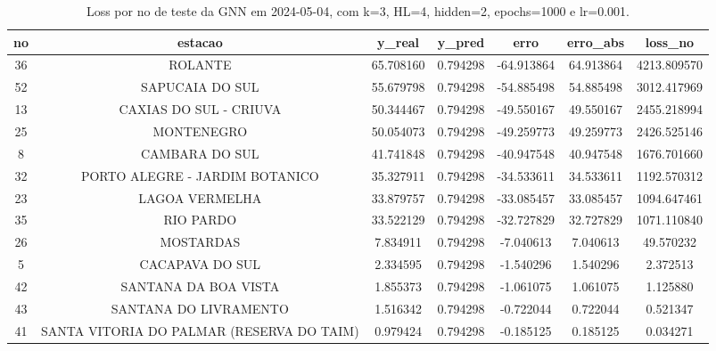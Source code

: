 \begin{table}[h]
\centering
\caption{Loss por no de teste da GNN em 2024-05-04, com k=3, HL=4, hidden=2, epochs=1000 e lr=0.001.}
\label{tab:gnn_loss_k3_hl4_h2_e1000_d20240504}
\begin{tabular}{ccccccc}
\toprule
no & estacao & y\_real & y\_pred & erro & erro\_abs & loss\_no \\
\midrule
36 & ROLANTE & 65.708160 & 0.794298 & -64.913864 & 64.913864 & 4213.809570 \\
52 & SAPUCAIA DO SUL & 55.679798 & 0.794298 & -54.885498 & 54.885498 & 3012.417969 \\
13 & CAXIAS DO SUL - CRIUVA & 50.344467 & 0.794298 & -49.550167 & 49.550167 & 2455.218994 \\
25 & MONTENEGRO & 50.054073 & 0.794298 & -49.259773 & 49.259773 & 2426.525146 \\
8 & CAMBARA DO SUL & 41.741848 & 0.794298 & -40.947548 & 40.947548 & 1676.701660 \\
32 & PORTO ALEGRE - JARDIM BOTANICO & 35.327911 & 0.794298 & -34.533611 & 34.533611 & 1192.570312 \\
23 & LAGOA VERMELHA & 33.879757 & 0.794298 & -33.085457 & 33.085457 & 1094.647461 \\
35 & RIO PARDO & 33.522129 & 0.794298 & -32.727829 & 32.727829 & 1071.110840 \\
26 & MOSTARDAS & 7.834911 & 0.794298 & -7.040613 & 7.040613 & 49.570232 \\
5 & CACAPAVA DO SUL & 2.334595 & 0.794298 & -1.540296 & 1.540296 & 2.372513 \\
42 & SANTANA DA BOA VISTA & 1.855373 & 0.794298 & -1.061075 & 1.061075 & 1.125880 \\
43 & SANTANA DO LIVRAMENTO & 1.516342 & 0.794298 & -0.722044 & 0.722044 & 0.521347 \\
41 & SANTA VITORIA DO PALMAR (RESERVA DO TAIM) & 0.979424 & 0.794298 & -0.185125 & 0.185125 & 0.034271 \\
\bottomrule
\end{tabular}
\end{table}
